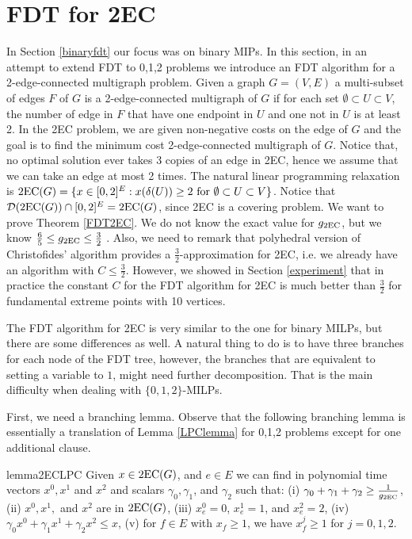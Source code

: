 
\section{FDT for 2EC}\label{2EC}

In Section \ref{binaryfdt} our focus was on binary MIPs. In this section, in an attempt to extend FDT to 0,1,2 problems we introduce an FDT algorithm for a 2-edge-connected multigraph problem. Given a graph $G=(V,E)$ a multi-subset of edges $F$ of $G$ is a 2-edge-connected multigraph of $G$ if for each set $\emptyset\subset U \subset V$, the number of edge in $F$ that have one endpoint in $U$ and one not in $U$ is at least 2. In the 2EC problem, we are given non-negative costs on the edge of $G$ and the goal is to find the minimum cost 2-edge-connected multigraph of $G$. Notice that, no optimal solution ever takes 3 copies of an edge in 2EC, hence we assume that we can take an edge at most 2 times. The natural linear programming relaxation is $\operatorname{2EC}(G) = \{x\in [0,2]^E: x(\delta(U))\geq 2 \mbox{ for } \emptyset \subset U \subset V\}$. Notice that $\operatorname{\mathcal{D}}(\operatorname{2EC}(G))\cap [0,2]^{E} = \operatorname{2EC}(G)$, since 2EC is a covering problem. We want to prove Theorem \ref{FDT2EC}.
We do not know the exact value for $g_{\operatorname{2EC}}$, but we know $\frac{6}{5} \leq g_{\operatorname{2EC}} \leq \frac{3}{2}$ \cite{carr-ravi,Wolsey1980}. Also, we need to remark that polyhedral version of Christofides' algorithm provides a $\frac{3}{2}$-approximation for 2EC, i.e. we already have an algorithm with $C\leq \frac{3}{2}$. However, we showed in Section \ref{experiment} that in practice the constant $C$ for the FDT algorithm for 2EC is much better than $\frac{3}{2}$ for fundamental extreme points with 10 vertices.

The FDT algorithm for 2EC is very similar to the one for binary MILPs, but there are some differences as well. A natural thing to do is to have three branches for each node of the FDT tree, however, the branches that are equivalent to setting a variable to $1$, might need further decomposition. That is the main difficulty when dealing with $\{0,1,2\}$-MILPs.

First, we need a branching lemma. Observe that  the following branching lemma is essentially a translation of Lemma \ref{LPClemma} for 0,1,2 problems except for one additional clause. 

\begin{restatable}{lemma}{2ECLPC}
	\label{LPC2EC}
	Given $x\in \operatorname{2EC}(G)$, and $e\in E$ we can find in polynomial time vectors $x^0,x^1$ and $x^2$ and scalars $\gamma_0,\gamma_1$, and $\gamma_2$ such that: (i) $\gamma_0 + \gamma_1 +\gamma_2 \geq \frac{ 1}{g_{\operatorname{2EC}}}$, (ii) $x^0,x^1,$ and $x^2$ are in  $ \operatorname{2EC}(G)$, (iii) $x^0_e=0$, $x^1_e=1$, and $x^2_e=2$, (iv) $\gamma_0 x^0 + \gamma_1{x}^1  + \gamma_2x^2\leq {x}$, (v) for $f\in E$ with ${x}_f\geq 1$, we have $x^j_f\geq 1$ for $j=0,1,2$.
\end{restatable}

